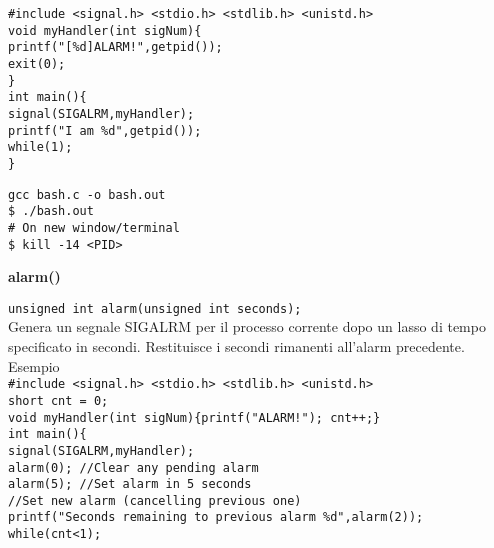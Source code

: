\begin{flushleft}
\begin{flushleft}
    \texttt{\#include <signal.h> <stdio.h> <stdlib.h> <unistd.h> \\
    void myHandler(int sigNum)\{ \\
    \halftab printf("[\%d]ALARM!\n",getpid()); \\
    \halftab exit(0);\\
    \} \\
    int main()\{ \\
    \halftab signal(SIGALRM,myHandler);\\
    \halftab printf("I am \%d\n",getpid());\\
    \halftab while(1);\\
    \}}\par 
    \begin{flushleft}
      \texttt{gcc bash.c -o bash.out\\
      \$ ./bash.out\\
      \# On new window/terminal\\
      \$ kill -14 <PID>\\}
    \end{flushleft}
  \end{flushleft}
  \begin{flushleft}
    \textbf{alarm()}\par 
    \texttt{unsigned int alarm(unsigned int seconds);}\\
    Genera un segnale SIGALRM per il processo corrente dopo un lasso di tempo 
    specificato in secondi. Restituisce i secondi rimanenti all'alarm precedente. \\
    Esempio \\
    \texttt{\#include <signal.h> <stdio.h> <stdlib.h> <unistd.h>\\
            short cnt = 0;\\
            void myHandler(int sigNum)\{printf("ALARM!\n"); cnt++;\} \\
            int main()\{ \\
            \halftab signal(SIGALRM,myHandler);\\
            \halftab alarm(0); //Clear any pending alarm\\
            \halftab alarm(5); //Set alarm in 5 seconds\\
            \halftab //Set new alarm (cancelling previous one)\\
            \halftab printf("Seconds remaining to previous alarm \%d\n",alarm(2));\\
            \halftab while(cnt<1);\\
}
\end{flushleft}
\end{flushleft}
